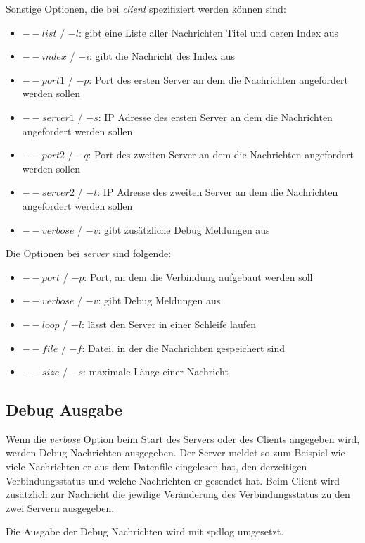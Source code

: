\documentclass[]{article}
\begin{document}
Sonstige Optionen, die bei \textit{client} spezifiziert werden können sind:

\begin{itemize}
	\item $--list$ / $-l$: gibt eine Liste aller Nachrichten Titel und deren Index aus
	\item $--index$ / $-i$: gibt die Nachricht des Index aus
	\item $--port1$ / $-p$: Port des ersten Server an dem die Nachrichten angefordert werden sollen
	\item $--server1$ / $-s$: IP Adresse des ersten Server an dem die Nachrichten angefordert werden sollen
	\item $--port2$ / $-q$: Port des zweiten Server an dem die Nachrichten angefordert werden sollen
	\item $--server2$ / $-t$: IP Adresse des zweiten Server an dem die Nachrichten angefordert werden sollen
	\item $--verbose$ / $-v$: gibt zusätzliche Debug Meldungen aus
\end{itemize}

\noindent
Die Optionen bei \textit{server} sind folgende:

\begin{itemize}
	\item $--port$ / $-p$: Port, an dem die Verbindung aufgebaut werden soll
	\item $--verbose$ / $-v$: gibt Debug Meldungen aus
	\item $--loop$ / $-l$: lässt den Server in einer Schleife laufen
	\item $--file$ / $-f$: Datei, in der die Nachrichten gespeichert sind
	\item $--size$ / $-s$: maximale Länge einer Nachricht
\end{itemize}

\subsection{Debug Ausgabe}
Wenn die \textit{verbose} Option beim Start des Servers oder des Clients angegeben wird, werden Debug Nachrichten ausgegeben. Der Server meldet so zum Beispiel wie viele Nachrichten er aus dem Datenfile eingelesen hat, den derzeitigen Verbindungsstatus und welche Nachrichten er gesendet hat. Beim Client wird zusätzlich zur Nachricht die jewilige Veränderung des Verbindungsstatus zu den zwei Servern ausgegeben.

Die Ausgabe der Debug Nachrichten wird mit spdlog umgesetzt.
\end{document}
